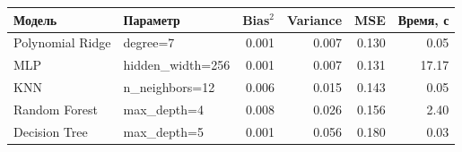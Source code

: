 \begin{center}
\small
\begin{tabular}{llrrrr}
\toprule
Модель & Параметр & Bias$^2$ & Variance & MSE & Время, с \\
\midrule
Polynomial Ridge & degree=7 & 0.001 & 0.007 & 0.130 & 0.05 \\
MLP & hidden\_width=256 & 0.001 & 0.007 & 0.131 & 17.17 \\
KNN & n\_neighbors=12 & 0.006 & 0.015 & 0.143 & 0.05 \\
Random Forest & max\_depth=4 & 0.008 & 0.026 & 0.156 & 2.40 \\
Decision Tree & max\_depth=5 & 0.001 & 0.056 & 0.180 & 0.03 \\
\bottomrule
\end{tabular}
\end{center}
